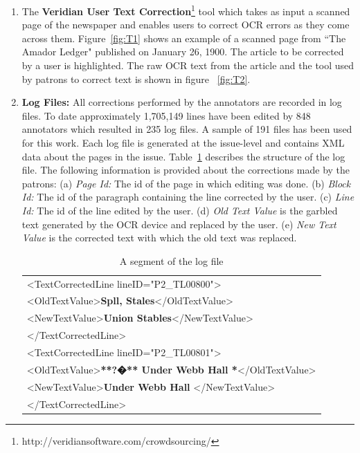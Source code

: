\documentclass[10pt, conference, compsocconf]{IEEEtran}
\begin{document}
\begin{enumerate}

\item The \textbf{Veridian User Text Correction}\footnote{http://veridiansoftware.com/crowdsourcing/} tool which takes as input a scanned page of the newspaper and enables users to correct OCR errors as they come across them.
Figure~\ref{fig:T1} shows an example of a scanned page from ``The Amador Ledger" published on January 26, 1900. The article to be corrected by a user is highlighted. The raw OCR text from the article and the tool used by patrons to correct text is shown in figure ~\ref{fig:T2}.


\item \textbf{Log Files: }All corrections performed by the annotators are recorded in log files. To date approximately 1,705,149 lines have been edited by 848 annotators which resulted in 235 log files. A sample of 191 files has been used for this work. Each log file is generated at the issue-level and contains XML data about the pages in the issue. Table~\ref{table:logfile} describes the structure of the log file. The following information is provided about the corrections made by the patrons:
(a) \textit{Page Id: } The id of the page in which editing was done.
(b) \textit{Block Id: } The id of the paragraph containing the line corrected by the user.
(c) \textit{Line Id: }The id of the line edited by the user.
(d) \textit{Old Text Value} is the garbled text generated by the OCR device and replaced by the user.
(e) \textit{New Text Value} is the corrected text with which the old text was replaced.

\begin{table}[h]
\begin{center}
\begin{tabular}{l}
\textless TextCorrectedLine lineID="P2\_TL00800"\textgreater \\
\textless OldTextValue\textgreater \textbf{Spll, Stales}\textless /OldTextValue\textgreater \\
\textless NewTextValue\textgreater \textbf{Union Stables}\textless /NewTextValue\textgreater \\
\textless /TextCorrectedLine\textgreater \\
\textless TextCorrectedLine lineID="P2\_TL00801"\textgreater \\
\textless OldTextValue\textgreater \textbf{**?�** Under Webb Hall *}\textless/OldTextValue\textgreater \\
\textless NewTextValue\textgreater \textbf{Under Webb Hall} \textless/NewTextValue\textgreater \\
\textless /TextCorrectedLine\textgreater \\
\end{tabular}
\end{center}
\caption{A segment of the log file}
\label{table:logfile}
\end{table}


\end{enumerate}
\end{document}
